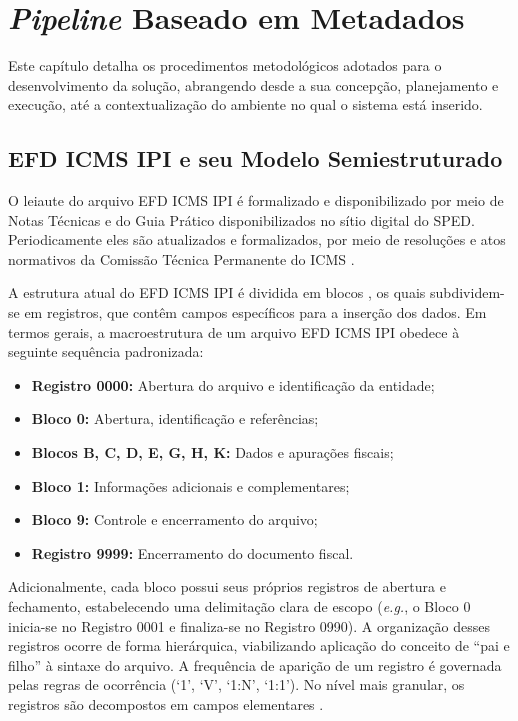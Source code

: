 \section{\textit{Pipeline} Baseado em Metadados}
\label{sec:metodologia}

Este capítulo detalha os procedimentos metodológicos adotados para o
desenvolvimento da solução, abrangendo desde a sua concepção, planejamento e
execução, até a contextualização do ambiente no qual o sistema está inserido.

\subsection{EFD ICMS IPI e seu Modelo Semiestruturado}
\label{sec:efd_modelo}

O leiaute do arquivo EFD ICMS IPI é formalizado e disponibilizado por meio de
Notas Técnicas \cite{nota_tecnica_efd} e do Guia Prático \cite{guia_pratico_efd}
disponibilizados no sítio digital do SPED. Periodicamente eles são
atualizados e formalizados, por meio de resoluções e atos normativos da Comissão
Técnica Permanente do ICMS \cite{ato_cotepe_44}.

A estrutura atual do EFD ICMS IPI é dividida em blocos \cite{nota_tecnica_efd},
os quais subdividem-se em registros, que contêm campos específicos para a
inserção dos dados. Em termos gerais, a macroestrutura de um arquivo EFD ICMS
IPI obedece à seguinte sequência padronizada:

\begin{itemize}
    \item \textbf{Registro 0000:} Abertura do arquivo e identificação da entidade;
    \item \textbf{Bloco 0:} Abertura, identificação e referências;
    \item \textbf{Blocos B, C, D, E, G, H, K:} Dados e apurações fiscais;
    \item \textbf{Bloco 1:} Informações adicionais e complementares;
    \item \textbf{Bloco 9:} Controle e encerramento do arquivo;
    \item \textbf{Registro 9999:} Encerramento do documento fiscal.
\end{itemize}

Adicionalmente, cada bloco possui seus próprios registros de abertura e
fechamento, estabelecendo uma delimitação clara de escopo (\textit{e.g.}, o
Bloco 0 inicia-se no Registro 0001 e finaliza-se no Registro 0990). A
organização desses registros ocorre de forma hierárquica, viabilizando 
aplicação do conceito de ``pai e filho'' à sintaxe do arquivo. A frequência de
aparição de um registro é governada pelas regras de ocorrência (`1', `V', `1:N',
`1:1'). No nível mais granular, os registros são decompostos em campos
elementares \cite{nota_tecnica_efd}.

